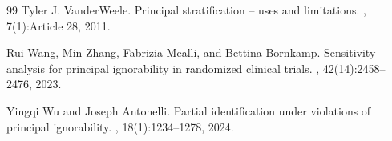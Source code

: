 \documentclass[11pt]{article}
\theoremstyle{definition}
\theoremstyle{plain}
\theoremstyle{remark}
\begin{document}
\begin{thebibliography}{99}
Tyler J. VanderWeele.
\newblock Principal stratification -- uses and limitations.
, 7(1):Article 28, 2011.

Rui Wang, Min Zhang, Fabrizia Mealli, and Bettina Bornkamp.
\newblock Sensitivity analysis for principal ignorability in randomized clinical trials.
, 42(14):2458--2476, 2023.

Yingqi Wu and Joseph Antonelli.
\newblock Partial identification under violations of principal ignorability.
, 18(1):1234--1278, 2024.

\end{thebibliography}
\end{document}
